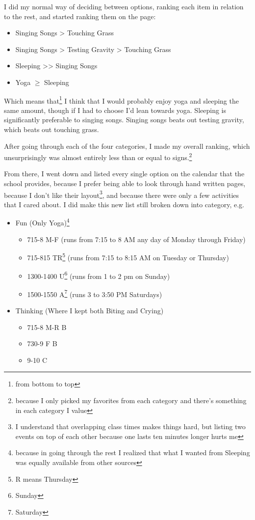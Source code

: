 \documentclass[12pt]{article}[titlepage]
\renewcommand{\,}{\textsuperscript{,}}
\begin{document}
I did my normal way of deciding between options, ranking each item in relation to the rest, and started ranking them on the page:  
\begin{itemize}  
\item Singing Songs > Touching Grass  
\item Singing Songs > Testing Gravity > Touching Grass  
\item Sleeping >> Singing Songs  
\item Yoga $\ge$ Sleeping  
\end{itemize}  
Which means that\footnote{from bottom to top} I think that I would probably enjoy yoga and sleeping the same amount, though if I had to choose I'd lean towards yoga.  
Sleeping is significantly preferable to singing songs.  
Singing songs beats out testing gravity, which beats out touching grass.

After going through each of the four categories, I made my overall ranking, which unsurprisingly was almost entirely less than or equal to signs.\footnote{because I only picked my favorites from each category and there's something in each category I value}

From there, I went down and listed every single option on the calendar that the school provides, because I prefer being able to look through hand written pages, because I don't like their layout\footnote{I understand that overlapping class times makes things hard, but listing two events on top of each other because one lasts ten minutes longer hurts me}, and because there were only a few activities that I cared about. I did make this new list still broken down into category, e.g.  
\begin{itemize}  
\item Fun (Only Yoga)\footnote{because in going through the rest I realized that what I wanted from Sleeping was equally available from other sources}  
\begin{itemize}  
\item 715-8 M-F (runs from 7:15 to 8 AM any day of Monday through Friday)  
\item 715-815 TR\footnote{R means Thursday} (runs from 7:15 to 8:15 AM on Tuesday or Thursday)  
\item 1300-1400 U\footnote{Sunday} (runs from 1 to 2 pm on Sunday)  
\item 1500-1550 A\footnote{Saturday} (runs 3 to 3:50 PM Saturdays)  
\end{itemize}  
\item Thinking (Where I kept both Biting and Crying)  
\begin{itemize}  
\item 715-8 M-R B  
\item 730-9 F B  
\item 9-10 C  
\end{itemize}  
\end{itemize}
\end{document}
